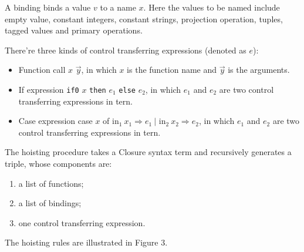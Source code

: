 \documentclass{article}
\theoremstyle{definition}
\theoremstyle{remark}
\numberwithin{equation}{section}
\begin{document}
A binding binds a value $v$ to a name $x$. Here the
values to be named include empty value, constant integers, constant strings,
projection operation, tuples, tagged values and primary operations.

There're three kinds of control transferring expressions (denoted as $e$):
\begin{itemize}
  \item Function call $x$ $\vec{y}$, in which $x$ is the function name
  and $\vec{y}$ is the arguments.
  \item If expression \texttt{if0} $x$ \texttt{then} $e_1$ \texttt{else} $e_2$,
     in which $e_1$ and $e_2$ are two
    control transferring expressions in tern.
  \item Case expression \textsf{case} $x$ \textsf{of in}$_1\ x_1 \Rightarrow e_1
    \ |$ \textsf{in}$_2\ x_2 \Rightarrow e_2$, in which $e_1$ and $e_2$ are two
    control transferring expressions in tern.
\end{itemize}

The hoisting procedure takes a Closure syntax term and recursively generates a
triple, whose components are:
\begin{enumerate}
  \item a list of functions;
  \item a list of bindings;
  \item one control transferring expression.
\end{enumerate}
The hoisting rules are illustrated in Figure 3.
\end{document}
